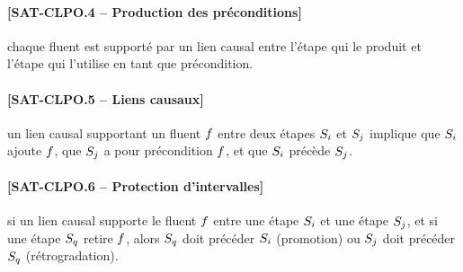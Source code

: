 {%
\paragraph*{[SAT-CLPO.4 -- Production des préconditions]} chaque fluent est supporté par un lien
  causal entre l'étape qui le produit et l'étape
  qui l'utilise en tant que précondition.
\paragraph*{[SAT-CLPO.5 -- Liens causaux]} un lien causal supportant un fluent $f$ entre
  deux étapes $S_{i}$ et $S_{j}$ implique que $S_{i}$ ajoute $f$, que $S_{j}$ a pour
  précondition $f$, et que $S_{i}$ précède $S_{j}$.
\paragraph*{[SAT-CLPO.6 -- Protection d'intervalles]} si un lien causal supporte le
  fluent $f$ entre une étape $S_{i}$ et une étape $S_{j}$, et si une étape $S_{q}$
  retire $f$, alors $S_{q}$ doit précéder $S_{i}$ (promotion) ou $S_{j}$ doit précéder
  $S_{q}$ (rétrogradation).
}
